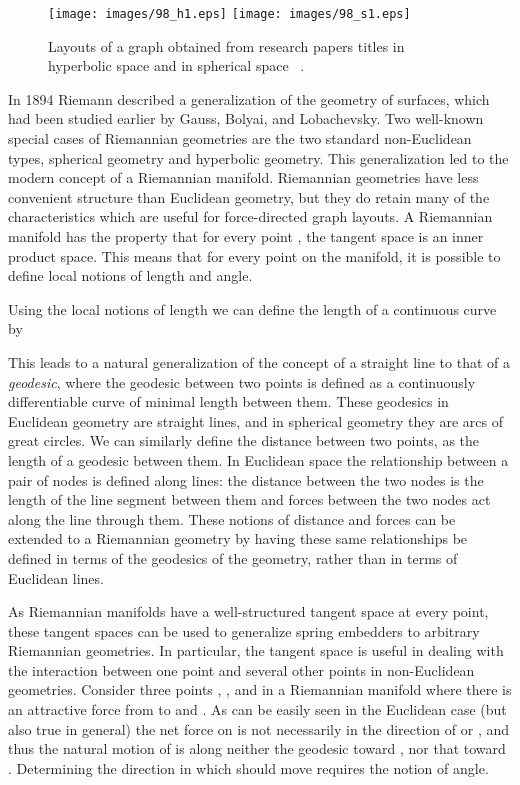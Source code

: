 \documentclass[notitlepage,letter,11pt]{article}
\begin{document}
\begin{figure*}[t]
\texttt{[image: images/98\_h1.eps]}
    \texttt{[image: images/98\_s1.eps]}
\caption
    {\small\sf
Layouts of a graph obtained from research papers titles in hyperbolic
space  and in spherical space ~\cite{kw-nese-05}.}
\label{fd:fig:sph}
\end{figure*}

In 1894 Riemann described a generalization of the geometry of
surfaces, which had been studied earlier by Gauss, Bolyai, and
Lobachevsky. Two well-known special cases of Riemannian geometries are
the two standard non-Euclidean types, spherical geometry and
hyperbolic geometry. This generalization led to the modern concept of
a Riemannian manifold. Riemannian geometries have less convenient
structure than Euclidean geometry, but they do retain many of the
characteristics which are useful for force-directed graph layouts.  A
Riemannian manifold  has the property that for every point , the tangent space  is an inner product space. This means
that for every point on the manifold, it is possible to define local
notions of length and angle.

Using the local notions of length we can define the length of a
continuous curve  by



This leads to a natural generalization of the concept of a straight
line to that of a {\em geodesic}, where the geodesic between two
points  is defined as a continuously differentiable curve of
minimal length between them.  These geodesics in Euclidean geometry
are straight lines, and in spherical geometry they are arcs of great
circles.  We can similarly define the distance between two points,
 as the length of a geodesic between them. In Euclidean space
the relationship between a pair of nodes is defined along lines: the
distance between the two nodes is the length of the line segment
between them and forces between the two nodes act along the line
through them.  These notions of distance and forces can be extended to
a Riemannian geometry by having these same relationships be defined in
terms of the geodesics of the geometry, rather than in terms of
Euclidean lines.

As Riemannian manifolds have a well-structured tangent space at every
point, these tangent spaces can be used to generalize spring embedders
to arbitrary Riemannian geometries. In particular, the tangent space
is useful in dealing with the interaction between one point and
several other points in non-Euclidean geometries.  Consider three
points , , and  in a Riemannian manifold  where there is
an attractive force from  to  and . As can be easily seen in
the Euclidean case (but also true in general) the net force on  is
not necessarily in the direction of  or , and thus the natural
motion of  is along neither the geodesic toward , nor that
toward . Determining the direction in which  should move
requires the notion of angle.
\end{document}
